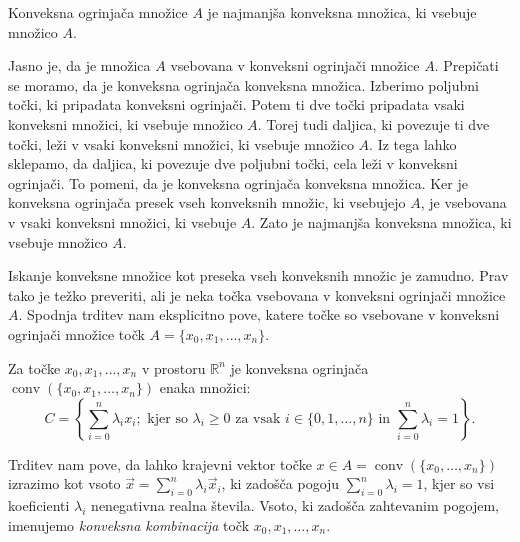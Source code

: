 \documentclass[mat1]{fmfdelo}
\newcommand{\R}{\mathbb R}
\DeclareMathOperator{\conv}{conv}
\newcommand{\0}{0}
\begin{document}
\begin{trditev}
Konveksna ogrinjača množice $A$ je najmanjša konveksna množica, ki vsebuje množico $A$.
\end{trditev}
\begin{dokaz}
Jasno je, da je množica $A$ vsebovana v konveksni ogrinjači množice $A$. Prepičati se moramo, da je konveksna ogrinjača konveksna množica. Izberimo poljubni točki, ki pripadata konveksni ogrinjači. Potem ti dve točki pripadata vsaki konveksni množici, ki vsebuje množico $A$. Torej tudi daljica, ki povezuje ti dve točki, leži v vsaki konveksni množici, ki vsebuje množico $A$. Iz tega lahko sklepamo, da daljica, ki povezuje dve poljubni točki, cela leži v konveksni ogrinjači. To pomeni, da je konveksna ogrinjača konveksna množica. Ker je konveksna ogrinjača presek vseh konveksnih množic, ki vsebujejo $A$, je vsebovana v vsaki konveksni množici, ki vsebuje $A$. Zato je najmanjša konveksna množica, ki vsebuje množico $A$.
\end{dokaz}



Iskanje konveksne množice kot preseka vseh konveksnih množic je zamudno. Prav tako je težko preveriti, ali je neka točka vsebovana v konveksni ogrinjači množice $A$. Spodnja trditev nam eksplicitno pove, katere točke so vsebovane v konveksni ogrinjači množice točk $A = \{x_0, x_1, \dots, x_n\}$.
\begin{trditev}
Za točke $x_0, x_1, \dots, x_n$ v prostoru $\R^n$ je konveksna ogrinjača $\conv(\{x_0, x_1, \dots, x_n\})$ enaka množici:
$$C =\left \{ \sum\limits_{i=0}^n \lambda_i x_i; \text{ kjer so } \lambda_i \geq 0 \text{ za vsak } i \in \{0, 1, \dots, n \} \text{ in } \sum\limits_{i=0}^n \lambda_i = 1  \right \}.$$
\end{trditev}
Trditev nam pove, da lahko krajevni vektor točke $x \in A = \conv (\{x_0, \dots, x_n\})$ izrazimo kot vsoto $\vec{x} = \sum\limits_{i=0}^n \lambda_i \vec{x}_i$, ki zadošča pogoju $\sum\limits_{i=0}^n \lambda_i = 1$, kjer so vsi koeficienti $\lambda_i$ nenegativna realna števila. Vsoto, ki zadošča zahtevanim pogojem, imenujemo \emph{konveksna kombinacija} točk $x_0, x_1, \dots , x_n$. 
\end{document}
